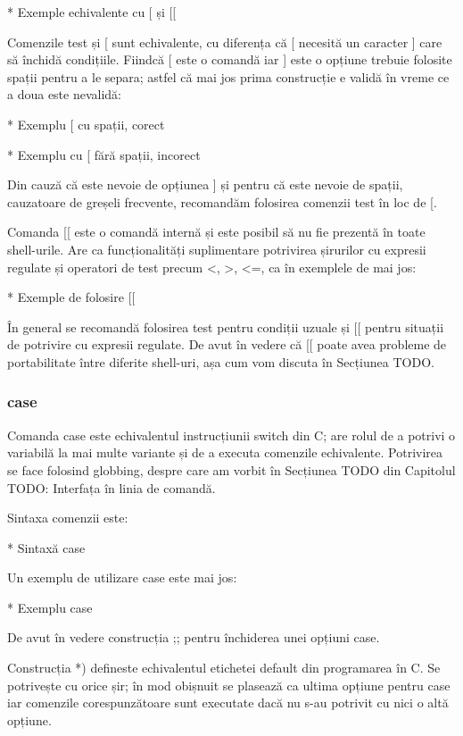 * Exemple echivalente cu [ și [[

Comenzile test și [ sunt echivalente, cu diferența că [ necesită un caracter ]
care să închidă condițiile. Fiindcă [ este o comandă iar ] este o opțiune
trebuie folosite spații pentru a le separa; astfel că mai jos prima construcție
e validă în vreme ce a doua este nevalidă:

* Exemplu [ cu spații, corect

* Exemplu cu [ fără spații, incorect

Din cauză că este nevoie de opțiunea ] și pentru că este nevoie de spații,
cauzatoare de greșeli frecvente, recomandăm folosirea comenzii test în loc de [.

Comanda [[ este o comandă internă și este posibil să nu fie prezentă în toate
shell-urile. Are ca funcționalități suplimentare potrivirea șirurilor cu
expresii regulate și operatori de test precum <, >, <=, ca în exemplele de mai
jos:

* Exemple de folosire [[

În general se recomandă folosirea test pentru condiții uzuale și [[ pentru
situații de potrivire cu expresii regulate. De avut în vedere că [[ poate avea
probleme de portabilitate între diferite shell-uri, așa cum vom discuta în
Secțiunea TODO.

\subsubsection{case}
\label{sec:script-func-flux-case}

Comanda case este echivalentul instrucțiunii switch din C; are rolul de a
potrivi o variabilă la mai multe variante și de a executa comenzile echivalente.
Potrivirea se face folosind globbing, despre care am vorbit în Secțiunea TODO
din Capitolul TODO: Interfața în linia de comandă.

Sintaxa comenzii este:

* Sintaxă case

Un exemplu de utilizare case este mai jos:

* Exemplu case

De avut în vedere construcția ;; pentru închiderea unei opțiuni case.

Construcția *) defineste echivalentul etichetei default din programarea în C. Se
potrivește cu orice șir; în mod obișnuit se plasează ca ultima opțiune pentru
case iar comenzile corespunzătoare sunt executate dacă nu s-au potrivit cu nici
o altă opțiune.

